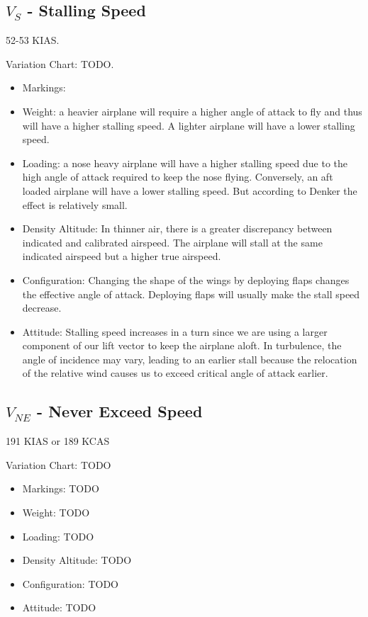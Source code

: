 \subsection{$V_{S}$ - Stalling Speed}

52-53 KIAS.

Variation Chart: TODO.

\begin{itemize}
\item Markings:
\item Weight: a heavier airplane will require a higher angle of attack to fly and thus will have a higher stalling speed. A lighter airplane will have a lower stalling speed.
\item Loading: a nose heavy airplane will have a higher stalling speed due to the high angle of attack required to keep the nose flying. Conversely, an aft loaded airplane will have a lower stalling speed. But according to Denker the effect is relatively small.
\item Density Altitude: In thinner air, there is a greater discrepancy between indicated and calibrated airspeed. The airplane will stall at the same indicated airspeed but a higher true airspeed.  
\item Configuration: Changing the shape of the wings by deploying flaps changes the effective angle of attack. Deploying flaps will usually make the stall speed decrease.
\item Attitude: Stalling speed increases in a turn since we are using a larger component of our lift vector to keep the airplane aloft. In turbulence, the angle of incidence may vary, leading to an earlier stall because the relocation of the relative wind causes us to exceed critical angle of attack earlier. 
\end{itemize}


\subsection{$V_{NE}$ - Never Exceed Speed}

191 KIAS or 189 KCAS

Variation Chart: TODO
\begin{itemize}
\item Markings: TODO
\item Weight: TODO
\item Loading: TODO
\item Density Altitude: TODO
\item Configuration: TODO
\item Attitude: TODO
\end{itemize}

